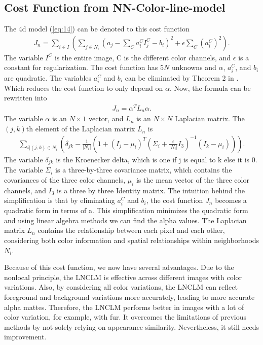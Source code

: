 \subsection{Cost Function from NN-Color-line-model}
The 4d model (\ref{eq:14}) can be denoted to this cost function
\begin{align}
	J_n = \sum\limits_{i\in I} \left( \sum\limits_{j \in N_i} \left( a_j -\sum\limits_{C} a_i^C I_j^C - b_i \right) ^2 + \epsilon\sum\limits_{C} \left( a_i^C \right) ^2 \right).
\end{align} 
The variable \(I^C\) is the entire image, C is the different color channels, and \(\epsilon\) is a constant for regularization. The cost function has \(5N\) unknowns and \(\alpha\), \(a_i^C\), and \(b_i\) are quadratic. The variables \(a_i^C\) and \(b_i\) can be eliminated by Theorem 2 in \cite{cf}. Which reduces the cost function to only depend on \(\alpha\). Now, the formula can be rewritten into
\begin{align}
	J_n = \alpha^T L_n \alpha .
\end{align} 
The variable \(\alpha\) is an \( N \times 1 \) vector, and \(L_n\) is an \(N \times N\) Laplacian matrix. The \( (j,k) \)th element of the Laplacian matrix \(L_n\) is 
\begin{align}\label{eq:37}
	\sum_{i|(j,k) \in N_i} \left( \delta_{jk} - \frac{1}{|N_i|} \left(1+ \left( I_j - \mu_i \right)^T \left( \Sigma_{i} + \frac{\epsilon}{|N_i|} I_3 \right)^{-1} \left( I_k - \mu_i \right) \right) \right) .
\end{align} 
The variable \(\delta_{jk}\) is the Kroenecker delta, which is one if j is equal to k else it is 0. The variable \(\Sigma_i\) is a three-by-three covariance matrix, which contains the covariances of the three color channels, \(\mu_i\) is the mean vector of the three color channels, and \(I_3\) is a three by three Identity matrix.
The intuition behind the simplification is that by eliminating  \(a_i^C\) and \(b_i\), the cost function \(J_n\) becomes a quadratic form in terms of a. This simplification minimizes the quadratic form and using linear algebra methods we can find the alpha values. The Laplacian matrix \(L_n\) contains the relationship between each pixel and each other, considering both color information and spatial relationships within neighborhoods \(N_i\).

Because of this cost function, we now have several advantages. Due to the nonlocal principle, the LNCLM is effective across different images with color variations. Also, by considering all color variations, the LNCLM can reflect foreground and background variations more accurately, leading to more accurate alpha mattes. Therefore, the LNCLM  performs better in images with a lot of color variation, for example, with fur. It overcomes the limitations of previous methods by not solely relying on appearance similarity. Nevertheless, it still needs improvement.  


